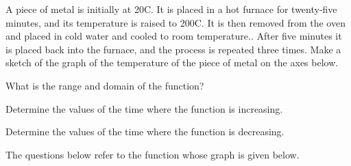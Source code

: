 \begin{problem}
\item A piece of metal is initially at 20C. It is placed in a hot
  furnace for twenty-five minutes, and its temperature is raised to
  200C. It is then removed from the oven and placed in cold water and
  cooled to room temperature.. After five minutes it is placed back
  into the furnace, and the process is repeated three times. Make a
  sketch of the graph of the temperature of the piece of metal on the
  axes below.

    \hspace{-7em}

      \begin{subproblem}
      \item What is the range and domain of the function?
        \vfill
      \item Determine the values of the time where the function is
        increasing.
        \vfill
      \item Determine the values of the time where the function is
        decreasing.  
        \vfill
      \end{subproblem}

      \clearpage
\item The questions below refer to the function whose graph is given
  below.


\end{problem}

